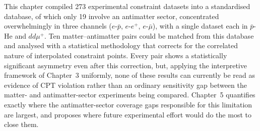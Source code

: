 \documentclass[main]{subfiles}
\begin{document}
This chapter compiled 273 experimental constraint datasets into a
standardised database, of which only 19 involve an antimatter sector,
concentrated overwhelmingly in three channels ($e$-$\bar p$, $e$-$e^+$,
$e$-$\bar\mu$), with a single dataset each in $\bar p$-He and $dd\mu^+$.
Ten matter--antimatter pairs could be matched from this database and
analysed with a statistical methodology that corrects for the correlated
nature of interpolated constraint points. Every pair shows a statistically
significant asymmetry even after this correction, but, applying the
interpretive framework of Chapter~3 uniformly, none of these results can
currently be read as evidence of CPT violation rather than an ordinary
sensitivity gap between the matter- and antimatter-sector experiments being
compared. Chapter~5 quantifies exactly where the antimatter-sector coverage
gaps responsible for this limitation are largest, and proposes where future
experimental effort would do the most to close them.
\end{document}
